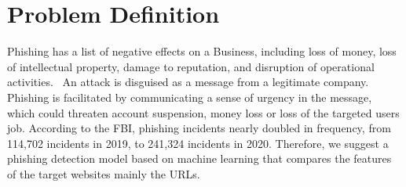 \section{Problem Definition}
\par Phishing has a list of negative effects on a Business, including loss of money, loss of intellectual property, damage to reputation, and disruption of operational activities.  An attack is disguised as a message from a legitimate company. Phishing is facilitated by communicating a sense of urgency in the message, which could threaten account suspension, money loss or loss of the targeted users job. According to the FBI, phishing incidents nearly doubled in frequency, from 114,702  incidents in 2019, to 241,324 incidents in 2020. Therefore, we suggest a phishing detection model based on machine learning that compares the features of the target websites mainly the URLs.

















































































